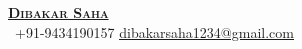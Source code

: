 \begin{center}
    \href{https://evilport-chatbotassistant.hf.space}{\textbf{\Huge \scshape Dibakar Saha}} \\ \vspace{1pt}
     \ \small +91-9434190157 \quad
    \href{mailto:dibakarsaha1234@gmail.com}{ \underline{dibakarsaha1234@gmail.com}} \quad
\end{center}